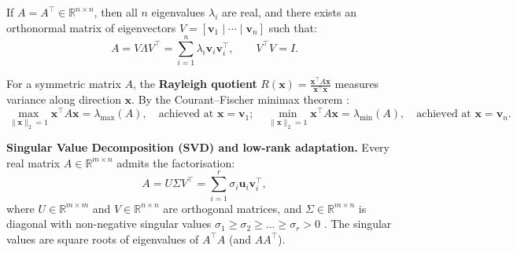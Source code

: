 \documentclass[11pt,a4paper]{article}
\begin{document}
	\begin{keyconcept}
		If $A = A^{\!\top} \in \mathbb{R}^{n \times n}$, then all $n$ eigenvalues $\lambda_i$ are real, and there exists an orthonormal matrix of eigenvectors $V = [\mathbf{v}_1 \mid \cdots \mid \mathbf{v}_n]$ such that:
		\begin{equation}
			A = V \Lambda V^{\!\top} = \sum_{i=1}^{n} \lambda_i \mathbf{v}_i \mathbf{v}_i^{\!\top}, \qquad V^{\!\top}V = I.
			\label{eq:spectral_decomp}
		\end{equation}
	\end{keyconcept}

	For a symmetric matrix $A$, the \textbf{Rayleigh quotient} $R(\mathbf{x}) = \frac{\mathbf{x}^{\!\top}A\mathbf{x}}{\mathbf{x}^{\!\top}\mathbf{x}}$ measures variance along direction $\mathbf{x}$. By the Courant--Fischer minimax theorem \parencite{golub2013, strang2019}:
	\begin{equation}
		\max_{\|\mathbf{x}\|_2=1} \mathbf{x}^{\!\top}A\mathbf{x} = \lambda_{\max}(A), \quad \text{achieved at } \mathbf{x} = \mathbf{v}_1; \quad
		\min_{\|\mathbf{x}\|_2=1} \mathbf{x}^{\!\top}A\mathbf{x} = \lambda_{\min}(A), \quad \text{achieved at } \mathbf{x} = \mathbf{v}_n.
		\label{eq:rayleigh_max}
	\end{equation}

	\begin{practicebox}[Eigendecomposition: verifying $A\mathbf{v}=\lambda\mathbf{v}$ and Rayleigh quotient]

	\end{practicebox}

	\textbf{Singular Value Decomposition (SVD) and low-rank adaptation.}
	Every real matrix $A \in \mathbb{R}^{m \times n}$ admits the factorisation:
	\begin{equation}
		A = U \Sigma V^{\!\top} = \sum_{i=1}^{r} \sigma_i \mathbf{u}_i \mathbf{v}_i^{\!\top},
		\label{eq:svd_full}
	\end{equation}
	where $U \in \mathbb{R}^{m \times m}$ and $V \in \mathbb{R}^{n \times n}$ are orthogonal matrices, and $\Sigma \in \mathbb{R}^{m \times n}$ is diagonal with non-negative singular values $\sigma_1 \ge \sigma_2 \ge \dots \ge \sigma_r > 0$ \parencite{trefethen1997, strang2019}. The singular values are square roots of eigenvalues of $A^{\!\top}A$ (and $AA^{\!\top}$).
\end{document}
